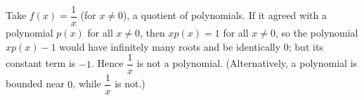 Take $f(x)=\dfrac{1}{x}$ (for $x\ne0$), a quotient of polynomials. If it agreed with a polynomial $p(x)$ for all $x\ne0$, then $xp(x)=1$ for all $x\ne0$, so the polynomial $xp(x)-1$ would have infinitely many roots and be identically $0$; but its constant term is $-1$. Hence $\dfrac{1}{x}$ is not a polynomial. (Alternatively, a polynomial is bounded near $0$, while $\dfrac{1}{x}$ is not.)
